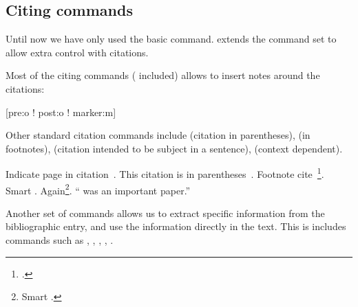\begin{example}[standalone,
  biber,
  biber_dir=../src/examples/,
  paperwidth=7cm,
  paperheight=3cm,
]
\usepackage[maxnames=4]{biblatex}

\sloppy

\nocite{lshort}
\printbibliography[heading=none]


\end{example}

\begin{example}[standalone,
  biber,
  biber_dir=../src/examples/,
  paperwidth=7cm,
  paperheight=3cm,
]
\usepackage[minnames=2]{biblatex}

\sloppy

\nocite{lshort}
\printbibliography[heading=none]


\end{example}

\subsection{Citing commands}

Until now we have only used the basic  command.  extends
the command set to allow extra control with
citations.

Most of the citing commands ( included) allows to insert notes
around the citations:
\begin{lscommand}
  [pre:o ! post:o ! marker:m]
\end{lscommand}
Other standard citation commands include  (citation in
parentheses),  (in footnotes),  (citation intended to
be subject in a sentence),  (context dependent).

\begin{example}[standalone,
  biber,
  biber_dir=../src/examples/,
  paperwidth=5cm,
  paperheight=5cm,
]
\usepackage[style=alphabetic]{biblatex}

\sloppy

Indicate page in citation~\cite[25]{lshort}. 
This citation is in
parentheses~\parencite{curie}.
Footnote cite~\footcite{dream}.
Smart \smartcite[See][78]{lshort}.
Again\footnote{Smart
\smartcite[12--56]{dream}.}.
``\Textcite{curie} was an important paper.''

\end{example}

Another set of commands allows us to extract specific information from
the bibliographic entry, and use the information directly in the text. This is includes commands such as ,
, , , .

